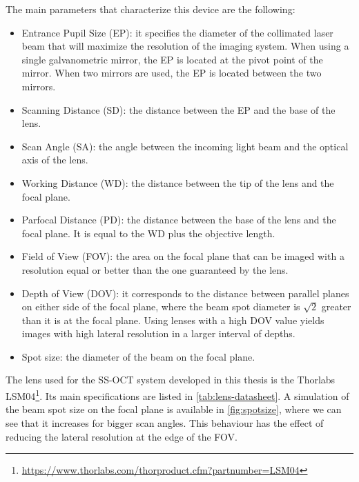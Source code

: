 The main parameters that characterize this device are the following:
\begin{itemize}
	\item Entrance Pupil Size (EP): it specifies the diameter of the collimated laser beam that will maximize the resolution of the imaging system. When using a single galvanometric mirror, the EP is located at the pivot point of the mirror. When two mirrors are used, the EP is located between the two mirrors. 

	\item Scanning Distance (SD): the distance between the EP and the base of the lens. 
	
	\item Scan Angle (SA): the angle between the incoming light beam and the optical axis of the lens. 
	
	\item Working Distance (WD): the distance between the tip of the lens and the focal plane.
	
	\item Parfocal Distance (PD): the distance between the base of the lens and the focal plane. It is equal to the WD plus the objective length.
	
	\item Field of View (FOV): the area on the focal plane that can be imaged with a resolution equal or better than the one guaranteed by the lens. 
	
	\item Depth of View (DOV): it corresponds to the distance between parallel planes on either side of the focal plane, where the beam spot diameter is $\sqrt{2}$ greater than it is at the focal plane. Using lenses with a high DOV value yields images with high lateral resolution in a larger interval of depths. 
	
	\item Spot size: the diameter of the beam on the focal plane. 
\end{itemize}


 The lens used for the SS-OCT system developed in this thesis is the Thorlabs LSM04\footnote{\url{https://www.thorlabs.com/thorproduct.cfm?partnumber=LSM04}}. Its main specifications are listed in \autoref{tab:lens-datasheet}. A simulation of the beam spot size on the focal plane is available in \autoref{fig:spotsize}, where we can see that it increases for bigger scan angles. This behaviour has the effect of reducing the lateral resolution at the edge of the FOV. 
 
